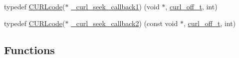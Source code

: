 \begin{DoxyCompactItemize}
\item 
typedef \hyperlink{curl_8h_af0691941698240652e0a391394217951}{C\+U\+R\+Lcode}($\ast$ \hyperlink{typecheck-gcc_8h_adebe91c0cf6ae015cc98752e4fe2c363}{\+\_\+curl\+\_\+seek\+\_\+callback1}) (void $\ast$, \hyperlink{curlbuild_8h_a494e2b4279dc064f7ed1d0abd602b28d}{curl\+\_\+off\+\_\+t}, int)
\item 
typedef \hyperlink{curl_8h_af0691941698240652e0a391394217951}{C\+U\+R\+Lcode}($\ast$ \hyperlink{typecheck-gcc_8h_a704fb61f39b18a5fde22c82d59b60865}{\+\_\+curl\+\_\+seek\+\_\+callback2}) (const void $\ast$, \hyperlink{curlbuild_8h_a494e2b4279dc064f7ed1d0abd602b28d}{curl\+\_\+off\+\_\+t}, int)
\end{DoxyCompactItemize}
\subsection*{Functions}
